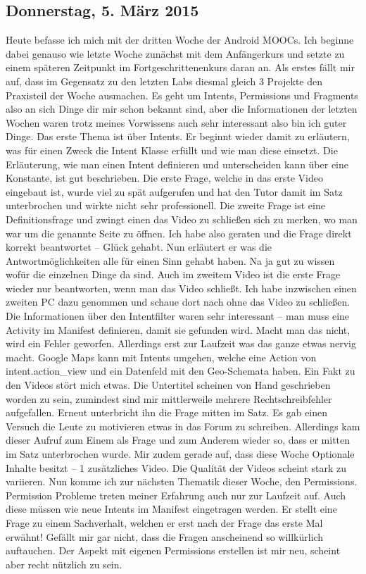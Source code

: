 \documentclass[12pt,a4paper,bibliography=totocnumbered,listof=totocnumbered]{scrartcl}
\begin{document}
\subsection{Donnerstag, 5. März 2015}
Heute befasse ich mich mit der dritten Woche der Android MOOCs. Ich beginne dabei genauso wie letzte Woche zunächst mit dem Anfängerkurs und setzte zu einem späteren Zeitpunkt im Fortgeschrittenenkurs daran an.
Als erstes fällt mir auf, dass im Gegensatz zu den letzten Labs diesmal gleich 3 Projekte den Praxisteil der Woche ausmachen. Es geht um Intents, Permissions und Fragments also an sich Dinge dir mir schon bekannt sind, aber die Informationen der letzten Wochen waren trotz meines Vorwissens auch sehr interessant also bin ich guter Dinge. 
Das erste Thema ist über Intents. Er  beginnt wieder damit zu erläutern, was für einen Zweck die Intent Klasse erfüllt und wie man diese einsetzt. Die Erläuterung, wie man einen Intent definieren und unterscheiden kann über eine Konstante, ist gut beschrieben. 
Die erste Frage, welche in das erste Video eingebaut ist, wurde viel zu spät aufgerufen und hat den Tutor damit im Satz unterbrochen und wirkte nicht sehr professionell. Die zweite Frage ist eine Definitionsfrage und zwingt einen das Video zu schließen sich zu merken, wo man war um die genannte Seite zu öffnen. Ich habe also geraten und die Frage direkt korrekt beantwortet – Glück gehabt. Nun erläutert er was die Antwortmöglichkeiten alle für einen Sinn gehabt haben. Na ja gut zu wissen wofür die einzelnen Dinge da sind. 
Auch im zweitem Video ist die erste Frage wieder nur beantworten, wenn man das Video schließt. 
Ich habe inzwischen einen zweiten PC dazu genommen und schaue dort nach ohne das Video zu schließen. 
Die Informationen über den Intentfilter waren sehr interessant – man muss eine Activity im Manifest definieren, damit sie gefunden wird. Macht man das nicht, wird ein Fehler geworfen. Allerdings erst zur Laufzeit was das ganze etwas nervig macht. Google Maps kann mit Intents umgehen, welche eine Action von 
\glqq intent.action\_view \grqq und ein Datenfeld mit den Geo-Schemata haben. 
Ein Fakt zu den Videos stört mich etwas. Die Untertitel scheinen von Hand geschrieben worden zu sein, zumindest sind mir mittlerweile mehrere Rechtschreibfehler aufgefallen. Erneut unterbricht ihn die Frage mitten im Satz. Es gab einen Versuch die Leute zu motivieren etwas in das Forum zu schreiben. Allerdings kam dieser Aufruf zum Einem als Frage und zum Anderem wieder so, dass er mitten im Satz unterbrochen wurde. Mir zudem gerade auf, dass diese Woche Optionale Inhalte besitzt – 1 zusätzliches Video. Die Qualität der Videos scheint stark zu variieren. 
Nun komme ich zur nächsten Thematik dieser Woche, den Permissions. 
Permission Probleme treten meiner Erfahrung auch nur zur Laufzeit auf. Auch diese müssen wie neue Intents im Manifest eingetragen werden. 
Er stellt eine Frage zu einem Sachverhalt, welchen er erst nach der Frage das erste Mal erwähnt! Gefällt mir gar nicht, dass die Fragen anscheinend so willkürlich auftauchen. Der Aspekt mit eigenen Permissions erstellen ist mir neu, scheint aber recht nützlich zu sein. 
\end{document}
